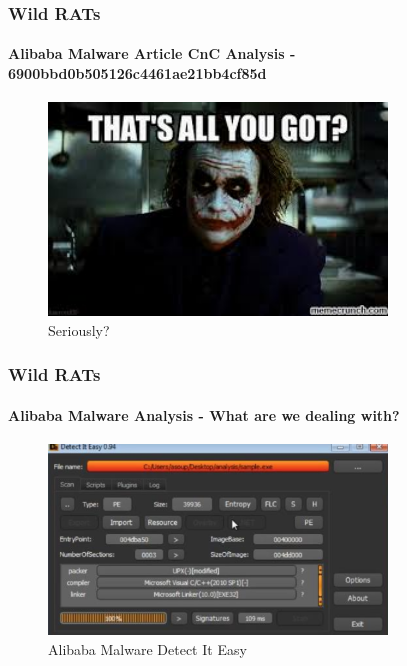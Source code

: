 \documentclass[aspectratio=169]{beamer}
\begin{document}
\begin{frame}
  \frametitle{Wild RATs}
  \framesubtitle{Alibaba Malware Article CnC Analysis - 6900bbd0b505126c4461ae21bb4cf85d}
  \begin{center}
    \begin{figure}
      \includegraphics[width=9cm,keepaspectratio]{thats_all_you_got}
      \caption{Seriously?}
    \end{figure}
  \end{center}
\end{frame}

\begin{frame}
  \frametitle{Wild RATs}
  \framesubtitle{Alibaba Malware Analysis - What are we dealing with?}
  \begin{center}
    \begin{figure}
      \includegraphics[width=9cm,keepaspectratio]{alibaba_die_main}
      \caption{Alibaba Malware Detect It Easy}
    \end{figure}
  \end{center}
\end{frame}
\end{document}
